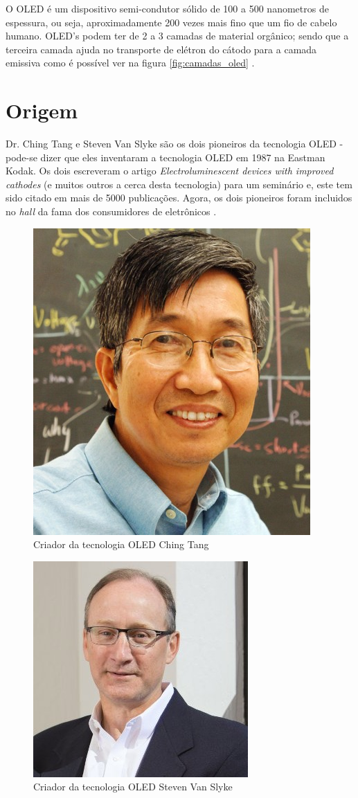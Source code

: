 O OLED é um dispositivo semi-condutor sólido de 100 a 500 nanometros de espessura, ou seja, aproximadamente 200 vezes mais fino que um fio de cabelo humano. OLED's podem ter de 2 a 3 camadas de material orgânico; sendo que a terceira camada ajuda no transporte de elétron do cátodo para a camada emissiva como é possível ver na figura \ref{fig:camadas_oled} \cite{HSWOLED}.\\

\section{Origem}
\label{sec:origem}

Dr. Ching Tang e Steven Van Slyke são os dois pioneiros da tecnologia OLED - pode-se dizer que eles inventaram a tecnologia OLED em 1987 na Eastman Kodak. Os dois escreveram o artigo \textit{Electroluminescent devices with improved cathodes} (e muitos outros a cerca desta tecnologia) para um seminário e, este tem sido citado em mais de 5000 publicações. Agora, os dois pioneiros foram incluidos no \textit{hall} da fama dos consumidores de eletrônicos \cite{OLEDPioneers}. \\

\begin{figure}[!ht]
  \centering
  \includegraphics[width=.40\textwidth]{./figuras/ching_tang} 
  \caption{Criador da tecnologia OLED Ching Tang}
  \label{fig:ching_tang} 
\end{figure}

\begin{figure}[!ht]
  \centering
  \includegraphics[width=.40\textwidth]{./figuras/steven_slyke} 
  \caption{Criador da tecnologia OLED Steven Van Slyke}
  \label{fig:steven_slyke} 
\end{figure}

